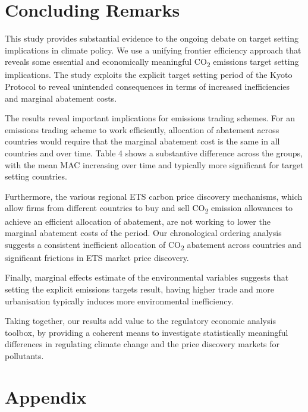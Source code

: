 \documentclass[
  10pt,
]{article}
\begin{document}
\newpage

\hypertarget{concluding-remarks}{%
\section{Concluding Remarks}\label{concluding-remarks}}

This study provides substantial evidence to the ongoing debate on target
setting implications in climate policy. We use a unifying frontier
efficiency approach that reveals some essential and economically
meaningful CO\textsubscript{2} emissions target setting implications.
The study exploits the explicit target setting period of the Kyoto
Protocol to reveal unintended consequences in terms of increased
inefficiencies and marginal abatement costs.

The results reveal important implications for emissions trading schemes.
For an emissions trading scheme to work efficiently, allocation of
abatement across countries would require that the marginal abatement
cost is the same in all countries and over time. Table 4 shows a
substantive difference across the groups, with the mean MAC increasing
over time and typically more significant for target setting countries.

Furthermore, the various regional ETS carbon price discovery mechanisms,
which allow firms from different countries to buy and sell
CO\textsubscript{2} emission allowances to achieve an efficient
allocation of abatement, are not working to lower the marginal abatement
costs of the period. Our chronological ordering analysis suggests a
consistent inefficient allocation of CO\textsubscript{2} abatement
across countries and significant frictions in ETS market price
discovery.

Finally, marginal effects estimate of the environmental variables
suggests that setting the explicit emissions targets result, having
higher trade and more urbanisation typically induces more environmental
inefficiency.

Taking together, our results add value to the regulatory economic
analysis toolbox, by providing a coherent means to investigate
statistically meaningful differences in regulating climate change and
the price discovery markets for pollutants.

\newpage

\hypertarget{appendix}{%
\section{Appendix}\label{appendix}}
\end{document}
